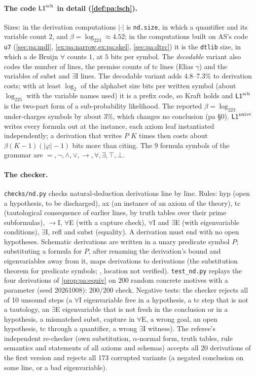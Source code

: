 \paragraph{The code $\mathord{\mathsf{L1}}^{\mathrm{sch}}$ in detail (\cref{def:pa:lsch}).} Sizes: in the derivation computations $|\cdot|$ is \texttt{nd.size}, in which a quantifier and its variable count $2$, and $\beta=\log_223\approx4.52$; in the computations built on AS's code \texttt{u7} (\cref{sec:pa:mdl}, \cref{ex:pa:narrow,ex:pa:skel}, \cref{sec:pa:dtrc}) it is the \texttt{dtlib} size, in which a de Bruijn $\forall$ counts $1$, at $5$ bits per symbol. The \emph{decodable} variant also codes the number of lines, the premise counts of tc lines (Elias $\gamma$) and the variables of subst and $\exists$I lines. The decodable variant adds 4.8--7.3\% to derivation costs; with at least $\log_2$ of the alphabet size bits per written symbol (about $\log_225$ with the variable names used) it is a prefix code, so Kraft holds  and $\mathord{\mathsf{L1}}^{\mathrm{sch}}$ is the two-part form of a sub-probability likelihood. The reported $\beta=\log_223$ under-charges symbols by about 3\%, which changes no conclusion (pa \S0). $\mathord{\mathsf{L1}}^{\mathrm{naive}}$ writes every formula out at the instance, each axiom leaf instantiated independently; a derivation that writes $P$ $K$ times then costs about $\beta(K-1)(|\varphi|-1)$ bits more than citing. The 9 formula symbols of the grammar are $=,\neg,\wedge,\vee,\to,\forall,\exists,\top,\bot$.

\paragraph{The checker.} 
\texttt{checks/nd.py} checks natural-deduction derivations line by line. Rules: hyp (open a hypothesis, to be discharged), ax (an instance of an axiom of the theory), tc (tautological consequence of earlier lines, by truth tables over their prime subformulas), $\to$I, $\forall$E (with a capture check), $\forall$I and $\exists$E (with eigenvariable conditions), $\exists$I, refl and subst (equality). A derivation must end with no open hypotheses. Schematic derivations are written in a unary predicate symbol $P$; substituting a formula for $P$, after renaming the derivation's bound and eigenvariables away from it, maps derivations to derivations (the substitution theorem for predicate symbols; \citealp{shoenfield1967mathematical}, location not verified). \texttt{test\_nd.py} replays the four derivations of \cref{prop:pa:equiv} on 200 random concrete motives with a parameter (seed 20261008): 200/200 check. Negative tests: the checker rejects all of 10 unsound steps (a $\forall$I eigenvariable free in a hypothesis, a tc step that is not a tautology, an $\exists$E eigenvariable that is not fresh in the conclusion or in a hypothesis, a mismatched subst, capture in $\forall$E, a wrong goal, an open hypothesis, tc through a quantifier, a wrong $\exists$I witness). The referee's independent re-checker (own substitution, $\alpha$-normal form, truth tables, rule semantics and statements of all axioms and schemas) accepts all 20 derivations of the first version and rejects all 173 corrupted variants (a negated conclusion on some line, or a bad eigenvariable).

